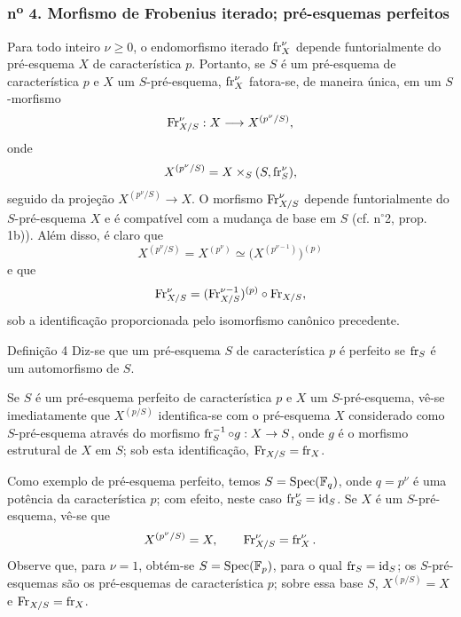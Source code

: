 \subsubsection*{n\textsuperscript{o} 4. Morfismo de Frobenius iterado; pré-esquemas perfeitos}

Para todo inteiro $\nu\geq 0$, o endomorfismo iterado $\operatorname{fr}_X^\nu$ depende funtorialmente do pré-esquema $X$ de característica $p$. Portanto, se $S$ é um pré-esquema de característica $p$ e $X$ um $S$-pré-esquema, $\operatorname{fr}_X^\nu$ fatora-se, de maneira única, em um $S$-morfismo
\[
\operatorname{Fr}_{X/S}^\nu:X\longrightarrow X^{(p^\nu/S)},
\]
onde
\[
X^{(p^\nu/S)}=X\times_S(S,\operatorname{fr}_S^\nu),
\]
seguido da projeção $X^{(p^\nu/S)}\to X$. O morfismo $\operatorname{Fr}_{X/S}^\nu$ depende funtorialmente do $S$-pré-esquema $X$ e é compatível com a mudança de base em $S$ (cf. n$^\circ$2, prop. 1b)). Além disso, é claro que
\[
X^{(p^\nu/S)}=X^{(p^\nu)}\simeq\bigl(X^{(p^{\nu-1})}\bigr)^{(p)}
\]
e que
\[
\operatorname{Fr}_{X/S}^\nu=(\operatorname{Fr}_{X/S}^{\nu-1})^{(p)}\circ\operatorname{Fr}_{X/S},
\]
sob a identificação proporcionada pelo isomorfismo canônico precedente.

\begin{statement}{Definição 4}
Diz-se que um pré-esquema $S$ de característica $p$ é perfeito se $\operatorname{fr}_S$ é um automorfismo de $S$.
\end{statement}

Se $S$ é um pré-esquema perfeito de característica $p$ e $X$ um $S$-pré-esquema, vê-se imediatamente que $X^{(p/S)}$ identifica-se com o pré-esquema $X$ considerado como $S$-pré-esquema através do morfismo $\operatorname{fr}_S^{-1}\circ g:X\to S$, onde $g$ é o morfismo estrutural de $X$ em $S$; sob esta identificação, $\operatorname{Fr}_{X/S}=\operatorname{fr}_X$.

Como exemplo de pré-esquema perfeito, temos $S=\operatorname{Spec}(\mathbb F_q)$, onde $q=p^\nu$ é uma potência da característica $p$; com efeito, neste caso $\operatorname{fr}_S^\nu=\operatorname{id}_S$. Se $X$ é um $S$-pré-esquema, vê-se que
\[
X^{(p^\nu/S)}=X,
\qquad
\operatorname{Fr}_{X/S}^\nu=\operatorname{fr}_X^\nu.
\]
Observe que, para $\nu=1$, obtém-se $S=\operatorname{Spec}(\mathbb F_p)$, para o qual $\operatorname{fr}_S=\operatorname{id}_S$; os $S$-pré-esquemas são os pré-esquemas de característica $p$; sobre essa base $S$, $X^{(p/S)}=X$ e $\operatorname{Fr}_{X/S}=\operatorname{fr}_X$.
